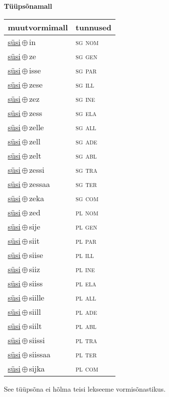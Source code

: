 

\vspace{3.5em}
\noindent \begin{minipage}{\textwidth}
\noindent \textbf{Tüüpsõnamall \,}\\

\begin{sideways}
\begin{tabular}{l l}
muutvormimall & tunnused \\
\hline
\underline{süsi}\,$\oplus$\,in & \textsc{ sg nom } \\
\underline{süsi}\,$\oplus$\,ze & \textsc{ sg gen } \\
\underline{süsi}\,$\oplus$\,isse & \textsc{ sg par } \\
\underline{süsi}\,$\oplus$\,zese & \textsc{ sg ill } \\
\underline{süsi}\,$\oplus$\,zez & \textsc{ sg ine } \\
\underline{süsi}\,$\oplus$\,zess & \textsc{ sg ela } \\
\underline{süsi}\,$\oplus$\,zelle & \textsc{ sg all } \\
\underline{süsi}\,$\oplus$\,zell & \textsc{ sg ade } \\
\underline{süsi}\,$\oplus$\,zelt & \textsc{ sg abl } \\
\underline{süsi}\,$\oplus$\,zessi & \textsc{ sg tra } \\
\underline{süsi}\,$\oplus$\,zessaa & \textsc{ sg ter } \\
\underline{süsi}\,$\oplus$\,zeka & \textsc{ sg com } \\
\underline{süsi}\,$\oplus$\,zed & \textsc{ pl nom } \\
\underline{süsi}\,$\oplus$\,sije & \textsc{ pl gen } \\
\underline{süsi}\,$\oplus$\,siit & \textsc{ pl par } \\
\underline{süsi}\,$\oplus$\,siise & \textsc{ pl ill } \\
\underline{süsi}\,$\oplus$\,siiz & \textsc{ pl ine } \\
\underline{süsi}\,$\oplus$\,siiss & \textsc{ pl ela } \\
\underline{süsi}\,$\oplus$\,siille & \textsc{ pl all } \\
\underline{süsi}\,$\oplus$\,siill & \textsc{ pl ade } \\
\underline{süsi}\,$\oplus$\,siilt & \textsc{ pl abl } \\
\underline{süsi}\,$\oplus$\,siissi & \textsc{ pl tra } \\
\underline{süsi}\,$\oplus$\,siissaa & \textsc{ pl ter } \\
\underline{süsi}\,$\oplus$\,sijka & \textsc{ pl com } \\
\end{tabular}
\end{sideways}
\label{tab:tüüpsõnamall-süsiin}

\end{minipage}

 
\vspace{1em}
\noindent See tüüpsõna ei hõlma teisi lekseeme vormi\-sõnastikus.
